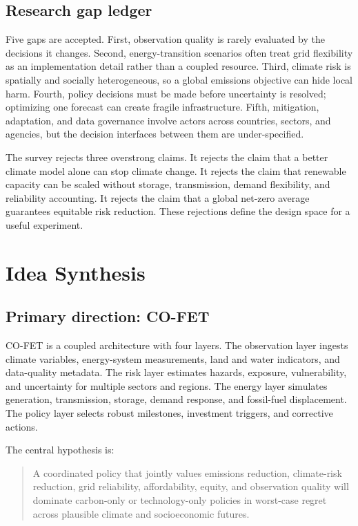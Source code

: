 \documentclass[conference]{IEEEtran}
\begin{document}
\subsection{Research gap ledger}
Five gaps are accepted. First, observation quality is rarely evaluated by the decisions it changes. Second, energy-transition scenarios often treat grid flexibility as an implementation detail rather than a coupled resource. Third, climate risk is spatially and socially heterogeneous, so a global emissions objective can hide local harm. Fourth, policy decisions must be made before uncertainty is resolved; optimizing one forecast can create fragile infrastructure. Fifth, mitigation, adaptation, and data governance involve actors across countries, sectors, and agencies, but the decision interfaces between them are under-specified.

The survey rejects three overstrong claims. It rejects the claim that a better climate model alone can stop climate change. It rejects the claim that renewable capacity can be scaled without storage, transmission, demand flexibility, and reliability accounting. It rejects the claim that a global net-zero average guarantees equitable risk reduction. These rejections define the design space for a useful experiment.

\section{Idea Synthesis}
\subsection{Primary direction: CO-FET}
CO-FET is a coupled architecture with four layers. The observation layer ingests climate variables, energy-system measurements, land and water indicators, and data-quality metadata. The risk layer estimates hazards, exposure, vulnerability, and uncertainty for multiple sectors and regions. The energy layer simulates generation, transmission, storage, demand response, and fossil-fuel displacement. The policy layer selects robust milestones, investment triggers, and corrective actions.

The central hypothesis is:
\begin{quote}
A coordinated policy that jointly values emissions reduction, climate-risk reduction, grid reliability, affordability, equity, and observation quality will dominate carbon-only or technology-only policies in worst-case regret across plausible climate and socioeconomic futures.
\end{quote}
\end{document}
